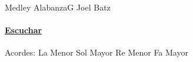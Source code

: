 \documentclass[12pt, spanish]{book}
\newcommand{\NotCCLIed}{\relax}
\begin{document}
    \begin{song}{Medley Alabanza}{G}
    {} %
    {Joel Batz}
    {} %
    {} %
        \ifChordBk
        \paragraph{\mbox{}\hfill\protect\href{https://open.spotify.com/intl-es/track/1HNwdNrebSlFxkkEuMWfu4}{Escuchar}\mbox{}\hfill}
        \fi


        \ifChordBk
        \begin{SBOpGroup}
            Acordes:
            \upchord{\Am}\qquad La Menor \hfill
            \upchord{\G}\qquad Sol Mayor \hfill\null\break
            \upchord{\Dm}\qquad Re Menor \hfill
            \upchord{\F}\qquad Fa Mayor \hfill\null\break
        \end{SBOpGroup}

        \fi
    \end{song}
\end{document}
